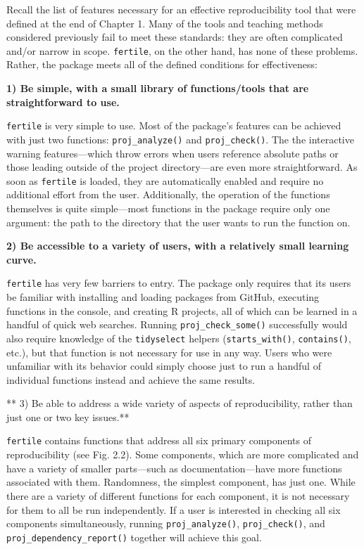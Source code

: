 \documentclass[12pt,twoside]{reedthesis}
\begin{document}
Recall the list of features necessary for an effective reproducibility tool that were defined at the end of Chapter 1. Many of the tools and teaching methods considered previously fail to meet these standards: they are often complicated and/or narrow in scope. \texttt{fertile}, on the other hand, has none of these problems. Rather, the package meets all of the defined conditions for effectiveness:

\textbf{1) Be simple, with a small library of functions/tools that are straightforward to use.}

\texttt{fertile} is very simple to use. Most of the package's features can be achieved with just two functions: \texttt{proj\_analyze()} and \texttt{proj\_check()}. The the interactive warning features---which throw errors when users reference absolute paths or those leading outside of the project directory---are even more straightforward. As soon as \texttt{fertile} is loaded, they are automatically enabled and require no additional effort from the user. Additionally, the operation of the functions themselves is quite simple---most functions in the package require only one argument: the path to the directory that the user wants to run the function on.

\textbf{2) Be accessible to a variety of users, with a relatively small learning curve.}

\texttt{fertile} has very few barriers to entry. The package only requires that its users be familiar with installing and loading packages from GitHub, executing functions in the console, and creating R projects, all of which can be learned in a handful of quick web searches. Running \texttt{proj\_check\_some()} successfully would also require knowledge of the \texttt{tidyselect} helpers (\texttt{starts\_with()}, \texttt{contains()}, etc.), but that function is not necessary for use in any way. Users who were unfamiliar with its behavior could simply choose just to run a handful of individual functions instead and achieve the same results.

** 3) Be able to address a wide variety of aspects of reproducibility, rather than just one or two key issues.**

\texttt{fertile} contains functions that address all six primary components of reproducibility (see Fig. 2.2). Some components, which are more complicated and have a variety of smaller parts---such as documentation---have more functions associated with them. Randomness, the simplest component, has just one. While there are a variety of different functions for each component, it is not necessary for them to all be run independently. If a user is interested in checking all six components simultaneously, running \texttt{proj\_analyze()}, \texttt{proj\_check()}, and \texttt{proj\_dependency\_report()} together will achieve this goal.
\end{document}

